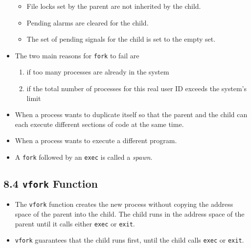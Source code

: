 \documentclass[]{article} \usepackage[all]{xy}
\newcommand{\code}{\texttt}
\begin{document}
\begin{itemize}
\begin{itemize}
\item File locks set by the parent are not inherited by the child.
\item Pending alarms are cleared for the child.
\item The set of pending signals for the child is set to the empty set.
\end{itemize}
\item The two main reasons for \code{fork} to fail are
\begin{enumerate}
\item if too many processes are already in the system
\item if the total number of processes for this real user ID exceeds the system's
limit
\end{enumerate}
\item When a process wants to duplicate itself so that the parent and the child
can each execute different sections of code at the same time.
\item When a process wants to execute a different program.
\item A \code{fork} followed by an \code{exec} is called a \emph{spawn}.
\end{itemize}

\subsection*{8.4 \code{vfork} Function}
\begin{itemize}
\item The \code{vfork} function creates the new process without copying the
address space of the parent into the child. The child runs in the address space
of the parent until it calls either \code{exec} or \code{exit}.
\item \code{vfork} guarantees that the child runs first, until the child calls
\code{exec} or \code{exit}.
\end{itemize}
\end{document}
